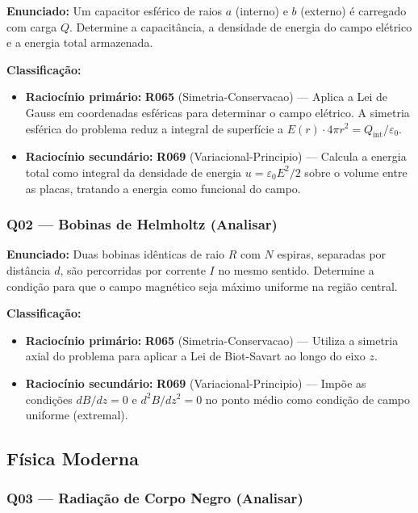\documentclass[12pt,a4paper]{article}
\newcommand{\rcode}[1]{\textcolor{azulprof}{\textbf{#1}}}
\newcommand{\bloom}[1]{\textcolor{verdeexame}{\textbf{#1}}}
\begin{document}
\textbf{Enunciado:} Um capacitor esférico de raios $a$ (interno) e $b$ (externo)
é carregado com carga $Q$. Determine a capacitância, a densidade de energia
do campo elétrico e a energia total armazenada.

\medskip
\noindent\textbf{Classificação:}
\begin{itemize}
  \item \textbf{Raciocínio primário:} \rcode{R065} (Simetria-Conservacao) ---
    Aplica a Lei de Gauss em coordenadas esféricas para determinar o campo
    elétrico. A simetria esférica do problema reduz a integral de superfície
    a $E(r)\cdot 4\pi r^2 = Q_{\text{int}}/\varepsilon_0$.
  \item \textbf{Raciocínio secundário:} \rcode{R069} (Variacional-Principio) ---
    Calcula a energia total como integral da densidade de energia
    $u = \varepsilon_0 E^2/2$ sobre o volume entre as placas, tratando a
    energia como funcional do campo.
\end{itemize}

\subsubsection{Q02 --- Bobinas de Helmholtz (\bloom{Analisar})}

\textbf{Enunciado:} Duas bobinas idênticas de raio $R$ com $N$ espiras,
separadas por distância $d$, são percorridas por corrente $I$ no mesmo
sentido. Determine a condição para que o campo magnético seja máximo
uniforme na região central.

\medskip
\noindent\textbf{Classificação:}
\begin{itemize}
  \item \textbf{Raciocínio primário:} \rcode{R065} (Simetria-Conservacao) ---
    Utiliza a simetria axial do problema para aplicar a Lei de Biot-Savart
    ao longo do eixo $z$.
  \item \textbf{Raciocínio secundário:} \rcode{R069} (Variacional-Principio) ---
    Impõe as condições $dB/dz = 0$ e $d^2B/dz^2 = 0$ no ponto médio como
    condição de campo uniforme (extremal).
\end{itemize}

\subsection{Física Moderna}

\subsubsection{Q03 --- Radiação de Corpo Negro (\bloom{Analisar})}
\end{document}
